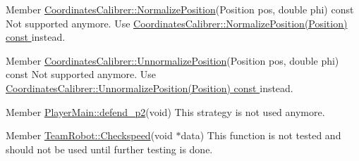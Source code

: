 \label{deprecated__deprecated000001}
\hypertarget{deprecated__deprecated000001}{}
 
\begin{DoxyDescription}
\item[Member \hyperlink{classCoordinatesCalibrer_a034180f011c23565b9b5907ce0219fbf}{CoordinatesCalibrer::NormalizePosition}(Position pos, double phi) const  ]Not supported anymore. Use \hyperlink{classCoordinatesCalibrer_ad6519b69842756c256922d14d1e248ce}{CoordinatesCalibrer::NormalizePosition(Position) const }instead.


\end{DoxyDescription}

\label{deprecated__deprecated000002}
\hypertarget{deprecated__deprecated000002}{}
 
\begin{DoxyDescription}
\item[Member \hyperlink{classCoordinatesCalibrer_a19035a69d4d571e5e1d4baa4ba10baee}{CoordinatesCalibrer::UnnormalizePosition}(Position pos, double phi) const  ]Not supported anymore. Use \hyperlink{classCoordinatesCalibrer_a8522193b13196313d001c589e7845bd3}{CoordinatesCalibrer::UnnormalizePosition(Position) const }instead.


\end{DoxyDescription}

\label{deprecated__deprecated000003}
\hypertarget{deprecated__deprecated000003}{}
 
\begin{DoxyDescription}
\item[Member \hyperlink{classPlayerMain_a64e1d5734e07cfa82b2571aa11bb4f9d}{PlayerMain::defend\_\-p2}(void) ]This strategy is not used anymore. 
\end{DoxyDescription}

\label{deprecated__deprecated000004}
\hypertarget{deprecated__deprecated000004}{}
 
\begin{DoxyDescription}
\item[Member \hyperlink{classTeamRobot_ac52f7f240fde40db09116e8639a53c21}{TeamRobot::Checkspeed}(void $\ast$data) ]This function is not tested and should not be used until further testing is done. 
\end{DoxyDescription}